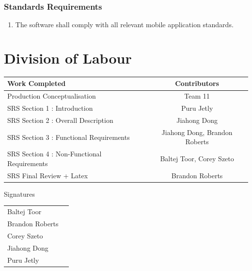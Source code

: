 \documentclass[]{article}
\begin{document}
\subsubsection{Standards Requirements}
\label{ssub:standards_requirements}
\begin{enumerate}[{LR}1. ]
	\item The software shall comply with all relevant mobile application standards.
\end{enumerate}



\appendix
\section{Division of Labour}
\label{sec:division_of_labour}

\begin{center}
\large
			\begin{tabular}{l|c}
				Work Completed   & Contributors \\\hline
				Production Conceptualisation &Team 11 \\
				SRS Section 1 : Introduction & Puru Jetly \\
				SRS Section 2 : Overall Description  & Jiahong Dong \\
				SRS Section 3 : Functional Requirements  & Jiahong Dong, Brandon Roberts  \\
				SRS Section 4 : Non-Functional Requirements  & Baltej Toor, Corey Szeto \\
				SRS Final Review + Latex  & Brandon Roberts \\
			\end{tabular}
			\vspace{0.1in}
\huge Signatures
\end{center}
			\vspace{0.3in}
\large
			\begin{tabular}{l|r}
			\vspace{1in}
				Baltej Toor  & \underline{\hspace{8cm}} \\
			\vspace{1in}
				Brandon Roberts   & \underline{\hspace{8cm}} \\
			\vspace{1in}
				Corey Szeto  & \underline{\hspace{8cm}} \\
			\vspace{1in}
				Jiahong Dong   & \underline{\hspace{8cm}} \\
			\vspace{1in}
				Puru Jetly   & \underline{\hspace{8cm}} \\
			\end{tabular}
\end{document}
